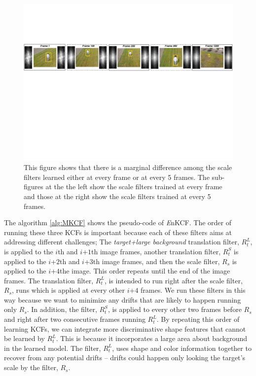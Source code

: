 \documentclass[10pt,twocolumn,letterpaper]{article}
\begin{document}
\begin{figure}[!h]
\centering
\includegraphics[width=1\textwidth]{./figures/LearnedFiltersComparison2.pdf}
\caption{This figure shows that there is a marginal difference among
  the scale filters learned either at every frame or at every 5
  frames. The sub-figures at the the left show the scale filters
  trained at every frame and those at the right show the scale filters
  trained at every 5 frames.}
\label{fig:Filters_Comparison}
\end{figure}

The algorithm \ref{alg:MKCF} shows the pseudo-code of {\it E}nKCF.
The order of running these three KCFs is important because each of
these filters aims at addressing different challenges; The
\textit{target+large background} translation filter, $R_{t}^{L}$, is
applied to the $i$th and $i$+$1$th image frames, another translation
filter, $R_{t}^{S}$ is applied to the $i$+$2$th and $i$+$3$th image
frames, and then the scale filter, $R_{s}$ is applied to the $i$+$4$the
image. This order repeats until the end of the image frames. The
translation filter, $R_{t}^{L}$, is intended to run right after the
scale filter, $R_s$, runs which is applied at every other $i$+$4$
frames. We run these filters in this way because we want to minimize
any drifts that are likely to happen running only $R_{s}$. In
addition, the filter, $R_{t}^{S}$, is applied to every other two
frames before $R_{s}$ and right after two consecutive frames running
$R_{t}^{L}$. By repeating this order of learning KCFs, we can
integrate more discriminative shape features that cannot be learned by
$R_{t}^{L}$. This is because it incorporates a large area about
background in the learned model. The filter, $R_{t}^{L}$, uses shape
and color information together to recover from any potential drifts --
drifts could happen only looking the target's scale by the filter,
$R_{s}$.
\end{document}
